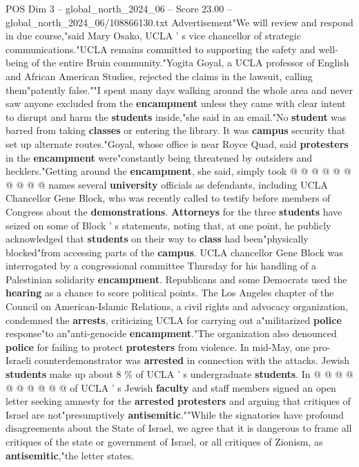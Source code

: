 \begin{textsample}{POS Dim 3 – global\_north\_2024\_06 – Score 23.00 – global\_north\_2024\_06/108866130.txt}
Advertisement"We will review and respond in due course,"said Mary Osako, UCLA ' s vice chancellor of strategic communications."UCLA remains committed to supporting the safety and well-being of the entire Bruin community."Yogita Goyal, a UCLA professor of English and African American Studies, rejected the claims in the lawsuit, calling them"patently false.""I spent many days walking around the whole area and never saw anyone excluded from the \textbf{encampment} unless they came with clear intent to disrupt and harm the \textbf{students} inside,"she said in an email."No \textbf{student} was barred from taking \textbf{classes} or entering the library.
It was \textbf{campus} security that set up alternate routes."Goyal, whose office is near Royce Quad, said \textbf{protesters} in the \textbf{encampment} were"constantly being threatened by outsiders and hecklers."Getting around the \textbf{encampment}, she said, simply took @ @ @ @ @ @ @ @ @ @ names several \textbf{university} officials as defendants, including UCLA Chancellor Gene Block, who was recently called to testify before members of Congress about the \textbf{demonstrations}. \textbf{Attorneys} for the three \textbf{students} have seized on some of Block ' s statements, noting that, at one point, he publicly acknowledged that \textbf{students} on their way to \textbf{class} had been"physically blocked"from accessing parts of the \textbf{campus}.
UCLA chancellor Gene Block was interrogated by a congressional committee Thursday for his handling of a Palestinian solidarity \textbf{encampment}.
Republicans and some Democrats used the \textbf{hearing} as a chance to score political points.
The Los Angeles chapter of the Council on American-Islamic Relations, a civil rights and advocacy organization, condemned the \textbf{arrests}, criticizing UCLA for carrying out a"militarized \textbf{police} response"to an"anti-genocide \textbf{encampment}."The organization also denounced \textbf{police} for failing to protect \textbf{protesters} from violence.
In mid-May, one pro-Israeli counterdemonstrator was \textbf{arrested} in connection with the attacks.
Jewish \textbf{students} make up about 8 \% of UCLA ' s undergraduate \textbf{students}.
In @ @ @ @ @ @ @ @ @ @ of UCLA ' s Jewish \textbf{faculty} and staff members signed an open letter seeking amnesty for the \textbf{arrested} \textbf{protesters} and arguing that critiques of Israel are not"presumptively \textbf{antisemitic}.""While the signatories have profound disagreements about the State of Israel, we agree that it is dangerous to frame all critiques of the state or government of Israel, or all critiques of Zionism, as \textbf{antisemitic},"the letter states.

\end{textsample}
